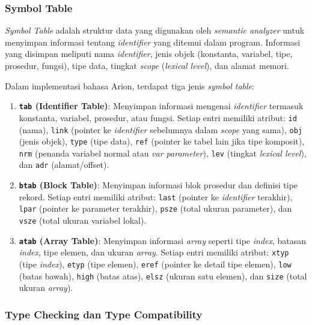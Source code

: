﻿\documentclass[12pt,a4paper]{article}
\begin{document}
\subsubsection{Symbol Table}

\textit{Symbol Table} adalah struktur data yang digunakan oleh \textit{semantic analyzer} untuk menyimpan informasi tentang \textit{identifier} yang ditemui dalam program. Informasi yang disimpan meliputi nama \textit{identifier}, jenis objek (konstanta, variabel, tipe, prosedur, fungsi), tipe data, tingkat \textit{scope} (\textit{lexical level}), dan alamat memori.

Dalam implementasi bahasa Arion, terdapat tiga jenis \textit{symbol table}:

\begin{enumerate}
    \item \textbf{\texttt{tab} (Identifier Table)}: Menyimpan informasi mengenai \textit{identifier} termasuk konstanta, variabel, prosedur, atau fungsi. Setiap entri memiliki atribut: \texttt{id} (nama), \texttt{link} (pointer ke \textit{identifier} sebelumnya dalam \textit{scope} yang sama), \texttt{obj} (jenis objek), \texttt{type} (tipe data), \texttt{ref} (pointer ke tabel lain jika tipe komposit), \texttt{nrm} (penanda variabel normal atau \textit{var parameter}), \texttt{lev} (tingkat \textit{lexical level}), dan \texttt{adr} (alamat/offset).

    \item \textbf{\texttt{btab} (Block Table)}: Menyimpan informasi blok prosedur dan definisi tipe rekord. Setiap entri memiliki atribut: \texttt{last} (pointer ke \textit{identifier} terakhir), \texttt{lpar} (pointer ke parameter terakhir), \texttt{psze} (total ukuran parameter), dan \texttt{vsze} (total ukuran variabel lokal).

    \item \textbf{\texttt{atab} (Array Table)}: Menyimpan informasi \textit{array} seperti tipe \textit{index}, batasan \textit{index}, tipe elemen, dan ukuran \textit{array}. Setiap entri memiliki atribut: \texttt{xtyp} (tipe \textit{index}), \texttt{etyp} (tipe elemen), \texttt{eref} (pointer ke detail tipe elemen), \texttt{low} (batas bawah), \texttt{high} (batas atas), \texttt{elsz} (ukuran satu elemen), dan \texttt{size} (total ukuran \textit{array}).
\end{enumerate}

\subsubsection{Type Checking dan Type Compatibility}
\end{document}
